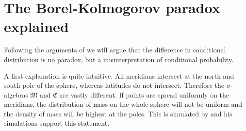 \documentclass[a4paper]{report}
\theoremstyle{plain}
\theoremstyle{definition}
\theoremstyle{remark}
\numberwithin{equation}{chapter}
\DeclareMathOperator{\1}{\mathbbm{1}}
\begin{document}
\section{The Borel-Kolmogorov paradox explained}\label{sec:BorelExplained}
Following the arguments of \cite{Gyenis17} we will argue that the difference in conditional distribution is no paradox, but a misinterpretation of conditional probability.

A first explanation is quite intuitive. All meridians intersect at the north and south pole of the sphere, whereas latitudes do not intersect. Therefore the $\sigma$-algebras $\mathfrak{M}$ and $\mathfrak{C}$ are vastly different. If points are spread uniformly on the meridians, the distribution of mass on the whole sphere will not be uniform and the density of mass will be highest at the poles. This is simulated by \cite{Weisstein} and his simulations support this statement.
\end{document}
